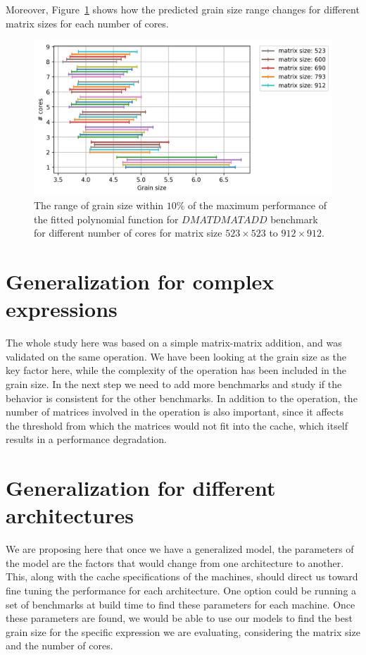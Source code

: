 Moreover, Figure~\ref{fig20} shows how the predicted grain size range changes for different matrix sizes for each number of cores.
 
\vspace{\baselineskip}	
\begin{figure}[H]
	\centering
	\includegraphics[scale=.5]{images/polyfit/fig_523-912_peak_range_all.png}

	\caption{The range of grain size within $10\%$ of the maximum performance of the fitted polynomial function for $DMATDMATADD$ benchmark for different number of cores for matrix size $523\times523$ to $912\times912$.}	
	\label{fig20}
\end{figure} 
\vspace{\baselineskip}	

\section{Generalization for complex expressions}
The whole study here was based on a simple matrix-matrix addition, and was validated on the same operation. We have been looking at the grain size as the key factor here, while the complexity of the operation has been included in the grain size. In the next step we need to add more benchmarks and study if the behavior is consistent for the other benchmarks. 
In addition to the operation, the number of matrices involved in the operation is also important, since it affects the threshold from which the matrices would not fit into the cache, which itself results in a performance degradation.


\vspace{\baselineskip}	
\section{Generalization for different architectures}
We are proposing here that once we have a generalized model, the parameters of the model are the factors that would change from one architecture to another. This, along with the cache specifications of the machines, should direct us toward fine tuning the performance for each architecture.
One option could be running a set of benchmarks at build time to find these parameters for each machine. Once these parameters are found, we would be able to use our models to find the best grain size for the specific expression we are evaluating, considering the matrix size and the number of cores.



